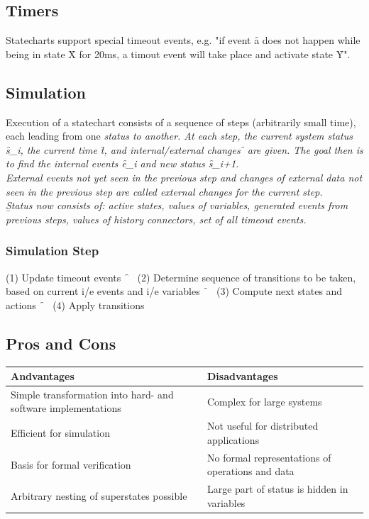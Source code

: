 \subsection{Timers}
Statecharts support special timeout events, e.g. "if event \f{a} does not happen while being in state \f{X} for 20ms, a timout event will take place and activate state \f{Y}".

\subsection{Simulation}
Execution of a statechart consists of a sequence of steps (arbitrarily small time), each leading from one \it{status} to another. At each step, the current system status \f{s_i}, the current time \f{t}, and internal/external changes \f{\Delta} are given. The goal then is to find the internal events \f{e_i} and new status \f{s_{i+1}}.\\
External events not yet seen in the previous step and changes of external data not seen in the previous step are called external changes for the current step.\\[0.5em]
\b{Status} now consists of: active states, values of variables, generated events from previous steps, values of history connectors, set of all timeout events.

\subsubsection{Simulation Step}
(1) Update timeout events \f{\ \rightarrow\ } (2) Determine sequence of transitions to be taken, based on current i/e events and i/e variables \f{\ \rightarrow\ } (3) Compute next states and actions \f{\ \rightarrow\ } (4) Apply transitions

\subsection{Pros and Cons}
\begin{table}[h!]
\begin{tabular}{|p{}|p{}|}\hline
\textbf{Andvantages}                                          & \textbf{Disadvantages}                           \\\hline\hline
Simple transformation into hard- and software implementations & Complex for large systems                        \\\hline
Efficient for simulation                                      & Not useful for distributed applications          \\\hline
Basis for formal verification                                 & No formal representations of operations and data \\\hline
Arbitrary nesting of superstates possible                     & Large part of status is hidden in variables      \\\hline
\end{tabular}
\end{table}








